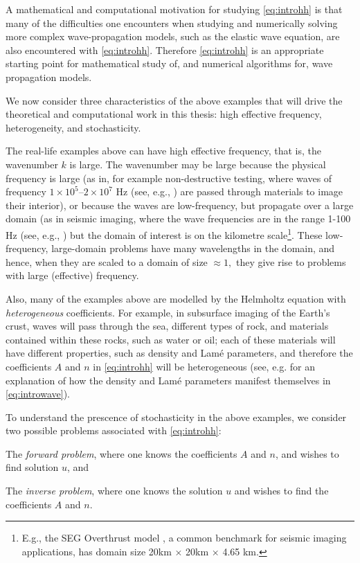 A mathematical and computational motivation for studying \eqref{eq:introhh} is that many of the difficulties one encounters when studying and numerically solving more complex wave-propagation models, such as the elastic wave equation, are also encountered with \eqref{eq:introhh}. Therefore \eqref{eq:introhh} is an appropriate starting point for mathematical study of, and numerical algorithms for, wave propagation models.

We now consider three characteristics of the above examples that will drive the theoretical and computational work in this thesis: high effective frequency, heterogeneity, and stochasticity.

The real-life examples above can have high effective frequency, that is, the wavenumber $k$ is large. The wavenumber may be large because the physical frequency is large (as in, for example non-destructive testing, where waves of frequency $1\times10^5$--$2\times10^7$ Hz (see, e.g., \cite{Bi}) are passed through materials to image their interior), or because the waves are low-frequency, but propagate over a large domain (as in seismic imaging, where the wave frequencies are in the range 1-100 Hz (see, e.g., \cite{Sc}) but the domain of interest is on the kilometre scale\footnote{E.g., the SEG Overthrust model \cite{AmBrKu:97}, a common benchmark for seismic imaging applications, has domain size 20km $\times$ 20km $\times$ 4.65 km.}. These low-frequency, large-domain problems have many wavelengths in the domain, and hence, when they are scaled to a domain of size $\approx 1,$ they give rise to problems with large (effective) frequency.

Also, many of the examples above are modelled by the Helmholtz equation with \emph{heterogeneous} coefficients. For example, in subsurface imaging of the Earth's crust, waves will pass through the sea, different types of rock, and materials contained within these rocks, such as water or oil; each of these materials will have different properties, such as density and Lam\'e parameters, and therefore the coefficients $A$ and $n$ in \eqref{eq:introhh} will be heterogeneous (see, e.g. \cite[Section 1.2.4]{Ch:15} for an explanation of how the density and Lam\'e parameters manifest themselves in \eqref{eq:introwave}).

To understand the prescence of stochasticity in the above examples, we consider two possible problems associated with \eqref{eq:introhh}:
\ben
\item The \emph{forward problem}, where one knows the coefficients $A$ and $n$, and wishes to find solution $u$, and
\item The \emph{inverse problem}, where one knows the solution $u$ and wishes to find the coefficients $A$ and $n$.
  \een

